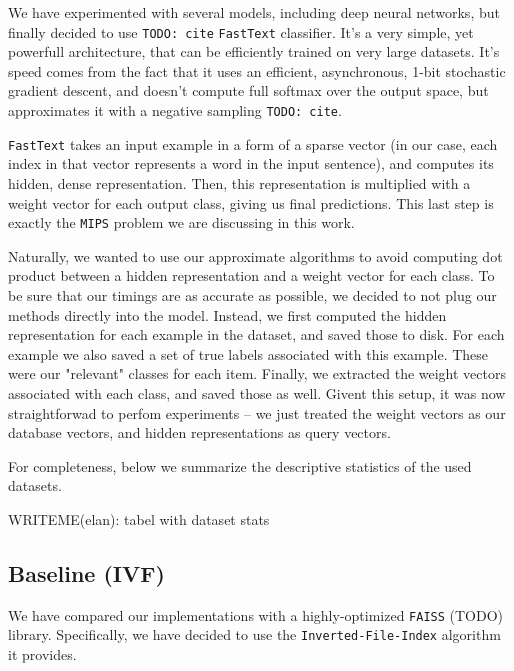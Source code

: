         We have experimented with several models, including deep neural networks, but finally decided to use
        \texttt{TODO: cite} \texttt{FastText} classifier. It's a very simple, yet powerfull architecture, that
        can be efficiently trained on very large datasets. It's speed comes from the fact that it uses an efficient,
        asynchronous, 1-bit stochastic gradient descent, and doesn't compute full softmax over the output space,
        but approximates it with a negative sampling \texttt{TODO: cite}.

        \texttt{FastText} takes an input example in a form of a sparse vector (in our case, each index in that vector
        represents a word in the input sentence), and computes its hidden, dense representation. Then, this
        representation is multiplied with a weight vector for each output class, giving us final predictions.
        This last step is exactly the \texttt{MIPS} problem we are discussing in this work.

        Naturally, we wanted to use our approximate algorithms to avoid computing dot product between a hidden
        representation and a weight vector for each class. To be sure that our timings are as accurate as possible,
        we decided to not plug our methods directly into the model. Instead, we first computed the hidden representation
        for each example in the dataset, and saved those to disk. For each example we also saved a set of
        true labels associated with this example. These were our "relevant" classes for each item.
        Finally, we extracted the weight vectors associated with each class, and saved those as well. Givent this setup,
        it was now straightforwad to perfom experiments -- we just treated the weight vectors as our database vectors,
        and hidden representations as query vectors.

        For completeness, below we summarize the descriptive statistics of the used datasets.

        WRITEME(elan): tabel with dataset stats


    \subsection{Baseline (IVF)}

        We have compared our implementations with a highly-optimized \texttt{FAISS} (TODO) library.
        Specifically, we have decided to use the \texttt{Inverted-File-Index} algorithm it provides.

